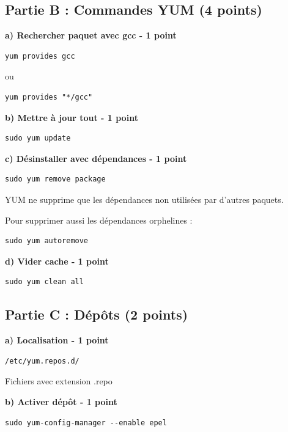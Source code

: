 \documentclass[12pt,a4paper]{article}
\begin{document}
\subsection*{Partie B : Commandes YUM (4 points)}

\begin{answerbox}
\textbf{a) Rechercher paquet avec gcc - 1 point}
\begin{lstlisting}
yum provides gcc
\end{lstlisting}

ou

\begin{lstlisting}
yum provides "*/gcc"
\end{lstlisting}

\textbf{b) Mettre à jour tout - 1 point}
\begin{lstlisting}
sudo yum update
\end{lstlisting}

\textbf{c) Désinstaller avec dépendances - 1 point}
\begin{lstlisting}
sudo yum remove package
\end{lstlisting}
YUM ne supprime que les dépendances non utilisées par d'autres paquets.

Pour supprimer aussi les dépendances orphelines :
\begin{lstlisting}
sudo yum autoremove
\end{lstlisting}

\textbf{d) Vider cache - 1 point}
\begin{lstlisting}
sudo yum clean all
\end{lstlisting}
\end{answerbox}

\subsection*{Partie C : Dépôts (2 points)}

\begin{answerbox}
\textbf{a) Localisation - 1 point}
\begin{lstlisting}
/etc/yum.repos.d/
\end{lstlisting}
Fichiers avec extension .repo

\textbf{b) Activer dépôt - 1 point}
\begin{lstlisting}
sudo yum-config-manager --enable epel
\end{lstlisting}
\end{answerbox}

\newpage
\end{document}
